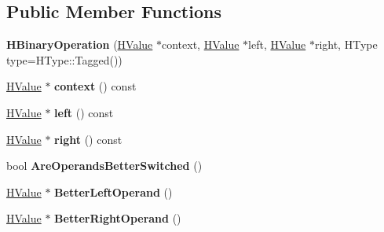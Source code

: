 \subsection*{Public Member Functions}
\begin{DoxyCompactItemize}
\item 
\hypertarget{classv8_1_1internal_1_1_h_binary_operation_a56faea075155f95059c1cb581bc20d59}{}{\bfseries H\+Binary\+Operation} (\hyperlink{classv8_1_1internal_1_1_h_value}{H\+Value} $\ast$context, \hyperlink{classv8_1_1internal_1_1_h_value}{H\+Value} $\ast$left, \hyperlink{classv8_1_1internal_1_1_h_value}{H\+Value} $\ast$right, H\+Type type=H\+Type\+::\+Tagged())\label{classv8_1_1internal_1_1_h_binary_operation_a56faea075155f95059c1cb581bc20d59}

\item 
\hypertarget{classv8_1_1internal_1_1_h_binary_operation_ab8f811855099ff11f8dd1c11ede5da26}{}\hyperlink{classv8_1_1internal_1_1_h_value}{H\+Value} $\ast$ {\bfseries context} () const \label{classv8_1_1internal_1_1_h_binary_operation_ab8f811855099ff11f8dd1c11ede5da26}

\item 
\hypertarget{classv8_1_1internal_1_1_h_binary_operation_a884245887fc3c60c5a98cd43219e2db8}{}\hyperlink{classv8_1_1internal_1_1_h_value}{H\+Value} $\ast$ {\bfseries left} () const \label{classv8_1_1internal_1_1_h_binary_operation_a884245887fc3c60c5a98cd43219e2db8}

\item 
\hypertarget{classv8_1_1internal_1_1_h_binary_operation_a64ea41aa271eff3dcebdf633b07c21ab}{}\hyperlink{classv8_1_1internal_1_1_h_value}{H\+Value} $\ast$ {\bfseries right} () const \label{classv8_1_1internal_1_1_h_binary_operation_a64ea41aa271eff3dcebdf633b07c21ab}

\item 
\hypertarget{classv8_1_1internal_1_1_h_binary_operation_abd65d8c23e876efc909fec628f5b4698}{}bool {\bfseries Are\+Operands\+Better\+Switched} ()\label{classv8_1_1internal_1_1_h_binary_operation_abd65d8c23e876efc909fec628f5b4698}

\item 
\hypertarget{classv8_1_1internal_1_1_h_binary_operation_a0472b9cc043d93ab89310680ad21803a}{}\hyperlink{classv8_1_1internal_1_1_h_value}{H\+Value} $\ast$ {\bfseries Better\+Left\+Operand} ()\label{classv8_1_1internal_1_1_h_binary_operation_a0472b9cc043d93ab89310680ad21803a}

\item 
\hypertarget{classv8_1_1internal_1_1_h_binary_operation_a3a779898407adae54e88df623d47169b}{}\hyperlink{classv8_1_1internal_1_1_h_value}{H\+Value} $\ast$ {\bfseries Better\+Right\+Operand} ()\label{classv8_1_1internal_1_1_h_binary_operation_a3a779898407adae54e88df623d47169b}


\end{DoxyCompactItemize}
